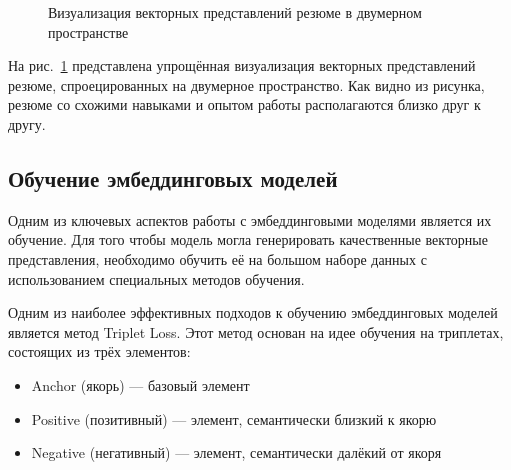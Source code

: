 \documentclass[14pt]{mmcs_article}
\begin{document}
\begin{figure}[h]
  \centering
  \caption{Визуализация векторных представлений резюме в двумерном пространстве}
  \label{fig:embedding_visualization}
\end{figure}

На рис.~\ref{fig:embedding_visualization} представлена упрощённая визуализация векторных представлений резюме, спроецированных на двумерное пространство. Как видно из рисунка, резюме со схожими навыками и опытом работы располагаются близко друг к другу.

\subsection{Обучение эмбеддинговых моделей}

Одним из ключевых аспектов работы с эмбеддинговыми моделями является их обучение. Для того чтобы модель могла генерировать качественные векторные представления, необходимо обучить её на большом наборе данных с использованием специальных методов обучения.

Одним из наиболее эффективных подходов к обучению эмбеддинговых моделей является метод Triplet Loss. Этот метод основан на идее обучения на триплетах, состоящих из трёх элементов:
\begin{itemize}
  \item Anchor (якорь) --- базовый элемент
  \item Positive (позитивный) --- элемент, семантически близкий к якорю
  \item Negative (негативный) --- элемент, семантически далёкий от якоря
\end{itemize}
\end{document}
